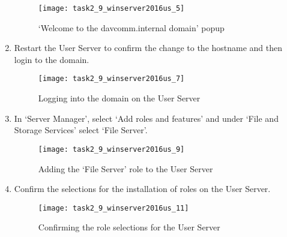 \begin{enumerate}[series=task2methodology4]
    \begin{figure}[H]
      \centering
      \captionsetup{skip=2pt}
      \texttt{[image: task2\_9\_winserver2016us\_5]}
      \caption{`Welcome to the davcomm.internal domain' popup}
      \label{fig:task2:vspherec_us5}
    \end{figure}
  \item Restart the User Server to confirm the change to the hostname and then login to the domain.
    \begin{figure}[H]
      \centering
      \captionsetup{skip=2pt}
      \texttt{[image: task2\_9\_winserver2016us\_7]}
      \caption{Logging into the domain on the User Server}
      \label{fig:task2:vspherec_us7}
    \end{figure}
  \item In `Server Manager', select `Add roles and features' and under `File and Storage Services' select `File Server'.
    \begin{figure}[H]
      \centering
      \captionsetup{skip=2pt}
      \texttt{[image: task2\_9\_winserver2016us\_9]}
      \caption{Adding the `File Server' role to the User Server}
      \label{fig:task2:vspherec_us9}
    \end{figure}
  \item Confirm the selections for the installation of roles on the User Server.
    \begin{figure}[H]
      \centering
      \captionsetup{skip=2pt}
      \texttt{[image: task2\_9\_winserver2016us\_11]}
      \caption{Confirming the role selections for the User Server}
      \label{fig:task2:vspherec_us11}
    \end{figure}
\end{enumerate}
\subsubsection{}
